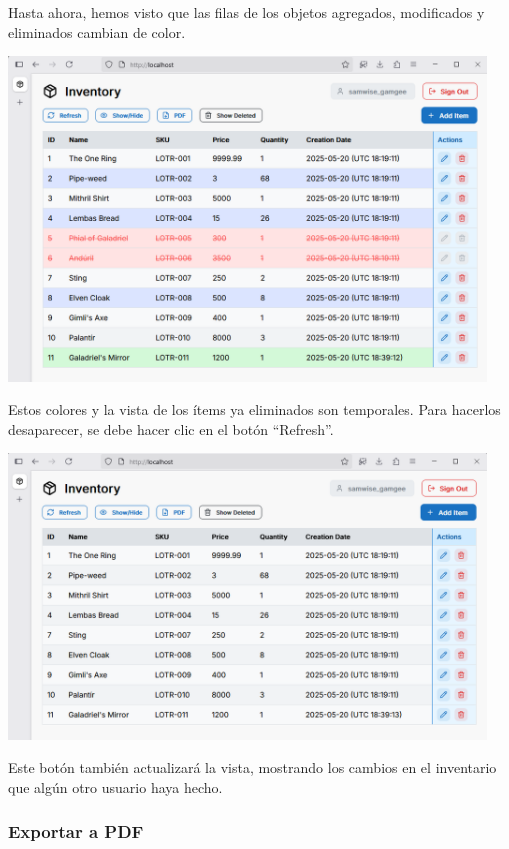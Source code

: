 Hasta ahora, hemos visto que las filas de los objetos agregados, modificados y eliminados cambian de color.

\begin{center}
\includegraphics[width=0.95\textwidth]{images/18 Colores}
\end{center}

Estos colores y la vista de los ítems ya eliminados son temporales. Para hacerlos desaparecer, se debe hacer clic en el botón “Refresh”.

\begin{center}
\includegraphics[width=0.95\textwidth]{images/19 Actualizado}
\end{center}

Este botón también actualizará la vista, mostrando los cambios en el inventario que algún otro usuario haya hecho.

\subsubsection{Exportar a PDF}

